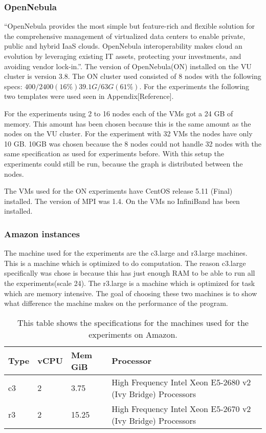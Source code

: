 \subsubsection{OpenNebula}
\label{hw:opennebula}
``OpenNebula  provides the most simple but feature-rich and flexible solution for the comprehensive management of virtualized data centers to enable private, public and hybrid IaaS clouds. OpenNebula interoperability makes cloud an evolution by leveraging existing IT assets, protecting your investments, and avoiding vendor lock-in.''\cite{opennebula}. The version of OpenNebula(ON) installed on the VU cluster is version 3.8. The ON cluster used consisted of 8 nodes with the following specs: $400 / 2400 (16\%)  39.1G / 63G (61\%)$. For the experiments the following two templates were used seen in Appendix[Reference].

For the experiments using 2 to 16 nodes each of the VMs got a 24 GB of memory. This amount has been chosen because this is the same amount as the nodes on the VU cluster. For the experiment with 32 VMs the nodes have only 10 GB. 10GB was chosen because the 8 nodes could not handle 32 nodes with the same specification as used for experiments before. With this setup the experiments could still be run, because the graph is distributed between the nodes. 

The VMs used for the ON experiments have CentOS release 5.11 (Final) installed. The version of MPI was 1.4. On the VMs no InfiniBand has been installed.

\subsubsection{Amazon instances}
\label{hw:Amazon}
The machine used for the experiments are the c3.large and r3.large machines. This is a machine which is optimized to do computation. The reason c3.large specifically was chose is because this has just enough RAM to be able to run all the experiments(scale 24). The r3.large is a machine which is optimized for task which are memory intensive. The goal of choosing these two machines is to show what difference the machine makes on the performance of the program.

\begin{table}
\begin{tabular}{|l|l|l|l|}
\hline
Type & vCPU & Mem GiB & Processor \\ \hline
c3 & 2 & 3.75 & High Frequency Intel Xeon E5-2680 v2 (Ivy Bridge) Processors \\ \hline
r3 & 2 & 15.25 & High Frequency Intel Xeon E5-2670 v2 (Ivy Bridge) Processors \\ \hline
\end{tabular}
\caption{This table shows  the specifications for the machines used for the experiments on Amazon.}
\label{tab:specs-amazong}
\end{table}
